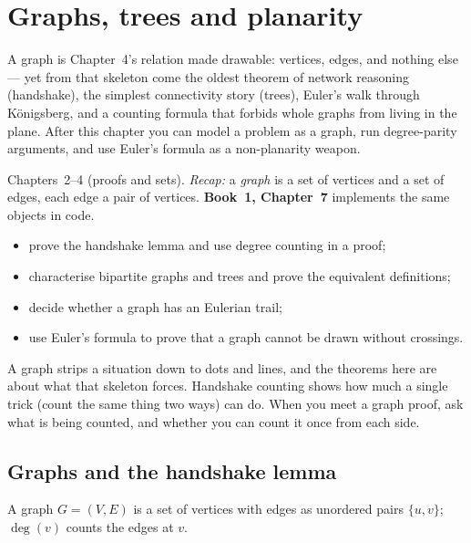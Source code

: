 \chapter{Graphs, trees and planarity}\label{ch:graphs}

A graph is Chapter~4's relation made drawable: vertices, edges, and
nothing else --- yet from that skeleton come the oldest theorem of
network reasoning (handshake), the simplest connectivity story (trees),
Euler's walk through Königsberg, and a counting formula that forbids
whole graphs from living in the plane. After this chapter you can model
a problem as a graph, run degree-parity arguments, and use Euler's
formula as a non-planarity weapon.

\begin{rulebox}
Chapters~2--4 (proofs and sets). \emph{Recap:} a \emph{graph} is a set of vertices and a set of edges, each edge a pair of vertices. \textbf{Book~1, Chapter~7} implements the same objects in code.
\end{rulebox}
\begin{wins}
\begin{itemize}
\item prove the handshake lemma and use degree counting in a proof;
\item characterise bipartite graphs and trees and prove the equivalent definitions;
\item decide whether a graph has an Eulerian trail;
\item use Euler's formula to prove that a graph cannot be drawn without crossings.
\end{itemize}
\end{wins}
\begin{principle}
A graph strips a situation down to dots and lines, and the theorems here are about what that skeleton forces. Handshake counting shows how much a single trick (count the same thing two ways) can do. When you meet a graph proof, ask what is being counted, and whether you can count it once from each side.
\end{principle}

\section{Graphs and the handshake lemma}\label{sec:handshake}
\begin{definition}
A graph $G = (V, E)$ is a set of vertices with edges as unordered pairs
$\{u,v\}$; $\deg(v)$ counts the edges at $v$.
\end{definition}

